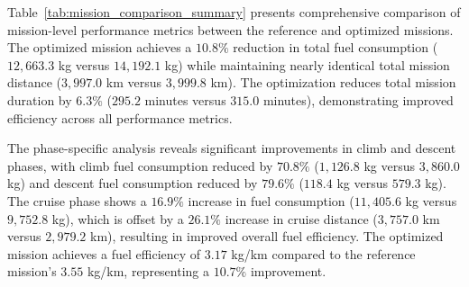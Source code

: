 Table~\ref{tab:mission_comparison_summary} presents comprehensive comparison of mission-level performance metrics between the reference and optimized missions. The optimized mission achieves a $10.8\%$ reduction in total fuel consumption ($12,663.3$ kg versus $14,192.1$ kg) while maintaining nearly identical total mission distance ($3,997.0$ km versus $3,999.8$ km). The optimization reduces total mission duration by $6.3\%$ ($295.2$ minutes versus $315.0$ minutes), demonstrating improved efficiency across all performance metrics.

The phase-specific analysis reveals significant improvements in climb and descent phases, with climb fuel consumption reduced by $70.8\%$ ($1,126.8$ kg versus $3,860.0$ kg) and descent fuel consumption reduced by $79.6\%$ ($118.4$ kg versus $579.3$ kg). The cruise phase shows a $16.9\%$ increase in fuel consumption ($11,405.6$ kg versus $9,752.8$ kg), which is offset by a $26.1\%$ increase in cruise distance ($3,757.0$ km versus $2,979.2$ km), resulting in improved overall fuel efficiency. The optimized mission achieves a fuel efficiency of $3.17$ kg/km compared to the reference mission's $3.55$ kg/km, representing a $10.7\%$ improvement.
